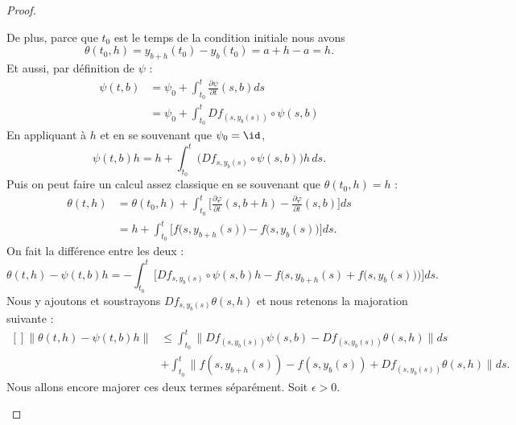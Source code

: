 \begin{proof}
\begin{subproof}
            De plus, parce que \( t_0\) est le temps de la condition initiale nous avons
            \begin{equation}
                \theta(t_0,h)=y_{b+h}(t_0)-y_{b}(t_0)=a+h-a=h.
            \end{equation}
            Et aussi, par définition de \( \psi\) :
            \begin{subequations}
                \begin{align}
                    \psi(t,b)&=\psi_0+\int_{t_0}^t\frac{ \partial \psi }{ \partial t }(s,b)ds\\
                    &=\psi_0+\int_{t_0}^tDf_{(s,y_b(s))}\circ\psi(s,b)
                \end{align}
            \end{subequations}
            En appliquant à \( h\) et en se souvenant que \( \psi_0=\id\),
            \begin{equation}
                    \psi(t,b)h=h+\int_{t_0}^t\Big( Df_{s,y_b(s)}\circ\psi(s,b)\Big)h\,ds.
            \end{equation}
            Puis on peut faire un calcul assez classique en se souvenant que \( \theta(t_0,h)=h\) :
            \begin{subequations}
                \begin{align}
                    \theta(t,h)&=\theta(t_0,h)+\int_{t_0}^t\big[ \frac{ \partial \varphi }{ \partial t }(s,b+h)-\frac{ \partial \varphi }{ \partial t }(s,b) \big]ds\\
                    &=h+\int_{t_0}^t\big[   f\big( s,y_{b+h}(s) \big)-f\big( s,y_b(s) \big)   \big]ds.
                \end{align}
            \end{subequations}
            On fait la différence entre les deux :
            \begin{equation}
                \theta(t,h)-\psi(t,b)h=-\int_{t_0}^t\big[ Df_{s,y_b(s)}\circ\psi(s,b)h-f\big( s,y_{b+h}(s)+f\big( s,y_b(s) \big) \big) \big]ds.
            \end{equation}
            Nous y ajoutons et soustrayons \( Df_{s,y_{b}(s)}\theta(s,h)\) et nous retenons la majoration suivante :
            \begin{equation}        \label{EQooODHPooDYyBoH}
                \begin{aligned}[]
                    \| \theta(t,h)-\psi(t,b)h \|&\leq \int_{t_0}^t\| Df_{(s,y_b(s))}\psi(s,b)-Df_{(s,y_b(s))} \theta(s,h)\| ds\\
                    &+\int_{t_0}^t\| f(s,y_{b+h}(s))-f(s,y_b(s))+Df_{(s,y_b(s))}\theta(s,h)  \|ds.
                \end{aligned}
            \end{equation}
            Nous allons encore majorer ces deux termes séparément. Soit \( \epsilon>0\).


\end{subproof}
\end{proof}
